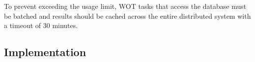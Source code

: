 To prevent exceeding the usage limit, WOT tasks that access the database must be batched and results should be cached across the entire distributed system with a timeout of 30 minutes.


\subsection{Implementation}




